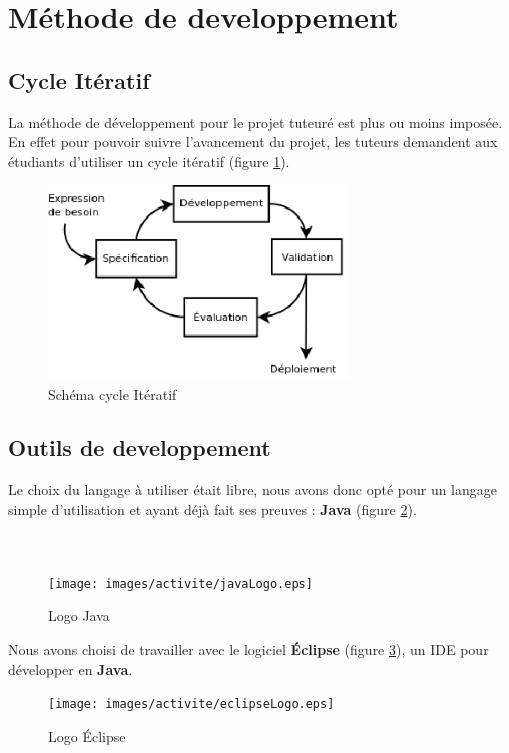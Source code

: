 \section{Méthode de developpement}


\subsection{Cycle Itératif}
La méthode de développement pour le projet tuteuré est plus ou moins imposée. En effet pour pouvoir suivre l'avancement du projet, les tuteurs demandent aux étudiants d'utiliser un cycle itératif (figure \ref{cycle_iteratif}).

\begin{figure}[H]
\centering
\includegraphics[width=8cm]{images/activite/cycle_iteratif.eps}
\caption{Schéma cycle Itératif}
\label{cycle_iteratif}
\end{figure}

\subsection{Outils de developpement}
Le choix du langage à utiliser était libre, nous avons donc opté pour un langage simple d'utilisation et ayant déjà fait ses preuves : \textbf{Java} (figure \ref{java_logo}).
\\
\\
\\

\begin{figure}[!h]
\centering
\texttt{[image: images/activite/javaLogo.eps]}
\caption{Logo Java}
\label{java_logo}
\end{figure}


Nous avons choisi de travailler avec le logiciel \textbf{Éclipse} (figure \ref{eclipse_logo}), un \gls{IDE} pour développer en \textbf{Java}.

\begin{figure}[H]
\centering
\texttt{[image: images/activite/eclipseLogo.eps]}
\caption{Logo Éclipse}
\label{eclipse_logo}
\end{figure}

